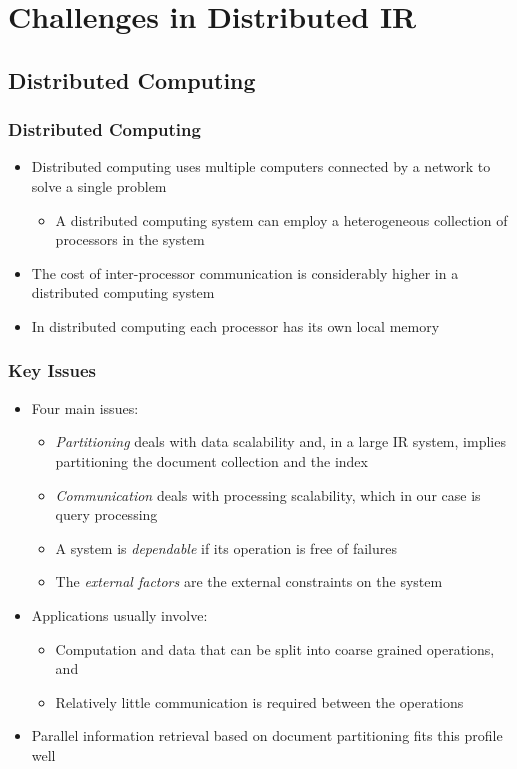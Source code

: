 \documentclass{beamer}
\begin{document}
\section{Challenges in Distributed IR}

\subsection{Distributed Computing}

\begin{frame}
    \frametitle{Distributed Computing}
    \begin{itemize}
    \item Distributed computing uses multiple computers connected by a network
        to solve a single problem
        \begin{itemize}
        \item A distributed computing system can employ a heterogeneous
            collection of processors in the system
        \end{itemize}
    \item The cost of inter-processor communication is considerably higher in a
        distributed computing system
    \item In distributed computing each processor has its own local memory
    \end{itemize}
\end{frame}

\begin{frame}
    \frametitle{Key Issues}
    \begin{itemize}
    \item Four main issues:
        \begin{itemize}
        \item \emph{Partitioning} deals with data scalability and, in a large
            IR system, implies partitioning the document collection and the
            index
        \item \emph{Communication} deals with processing scalability, which in
            our case is query processing
        \item A system is \emph{dependable} if its operation is free of
            failures
        \item The \emph{external factors} are the external constraints on the
            system
        \end{itemize}
    \item Applications usually involve:
        \begin{itemize}
        \item Computation and data that can be split into coarse grained
            operations, and
        \item Relatively little communication is required between the
            operations
        \end{itemize}
    \item Parallel information retrieval based on document partitioning fits
        this profile well
    \end{itemize}
\end{frame}
\end{document}
